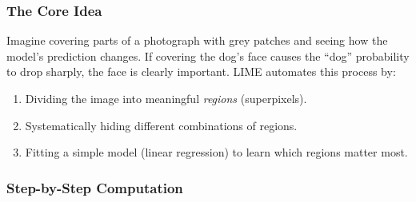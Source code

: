 \documentclass[12pt, a4paper]{article}
\begin{document}
\subsubsection{The Core Idea}

Imagine covering parts of a photograph with grey patches and seeing how the
model's prediction changes.  If covering the dog's face causes the ``dog''
probability to drop sharply, the face is clearly important.  LIME automates
this process by:
\begin{enumerate}[leftmargin=*]
    \item Dividing the image into meaningful \emph{regions} (superpixels).
    \item Systematically hiding different combinations of regions.
    \item Fitting a simple model (linear regression) to learn which regions
          matter most.
\end{enumerate}

\subsubsection{Step-by-Step Computation}
\end{document}
